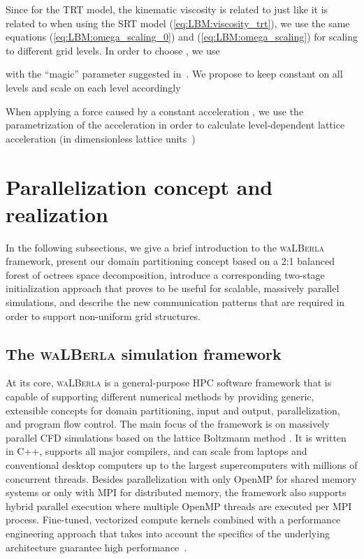 \documentclass[final,leqno,onefignum,onetabnum]{siamltex1213}
\newcommand{\Walberla}{\textsc{waLBerla}}
\begin{document}
Since for the TRT model, the kinematic viscosity is related to  just like it is related to  when using the SRT model (\ref{eq:LBM:viscosity_trt}),
we use the same equations (\ref{eq:LBM:omega_scaling_0}) and (\ref{eq:LBM:omega_scaling}) for scaling  to different grid levels.
In order to choose , we use

with the ``magic'' parameter  suggested in~\cite{Ginzburg2008}. We propose to keep  constant on all levels and scale 
on each level accordingly

When applying a force caused by a constant acceleration ,
we use the parametrization of the acceleration in order to calculate level-dependent lattice acceleration  (in dimensionless lattice units~\cite{lattlbm2008})


\section{Parallelization concept and realization}\label{sec:pconcept}

In the following subsections, we give a brief introduction to the \Walberla{} framework,
present our domain partitioning concept based on a 2:1 balanced forest of octrees space decomposition,
introduce a corresponding two-stage initialization approach that proves to be useful for scalable, massively parallel simulations,
and describe the new communication patterns that are required in order to support non-uniform grid structures.

\subsection{The \Walberla{} simulation framework}\label{sec:pconcept:walberla}

At its core, \Walberla{} is a general-purpose HPC software framework that is capable of supporting different numerical methods by providing generic,
extensible concepts for domain partitioning, input and output, parallelization, and program flow control.
The main focus of the framework is on massively parallel CFD simulations based on the lattice Boltzmann method \cite{Godenschwager2013,ammer2014simulating,Bartuschat:2015:CP,C3FO60374A,Bogner201571,Pickl2014}.
It is written in C++, supports all major compilers,
and can scale from laptops and conventional desktop computers up to the largest supercomputers with millions of concurrent threads.
Besides parallelization with only OpenMP for shared memory systems or only with MPI
for distributed memory, the framework also supports hybrid parallel execution where
multiple OpenMP threads are executed per MPI process.
Fine-tuned, vectorized compute kernels combined with a performance engineering approach that
takes into account the specifics of the underlying architecture guarantee high performance~\cite{Godenschwager2013,Bauer:2015:MPP}.
\end{document}
